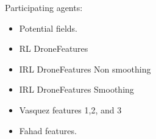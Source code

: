 Participating agents:
\begin{itemize}
        \item Potential fields.
        \item RL DroneFeatures
        \item IRL DroneFeatures Non smoothing
        \item IRL DroneFeatures Smoothing
        \item Vasquez features 1,2, and 3
        \item Fahad features.
\end{itemize}
